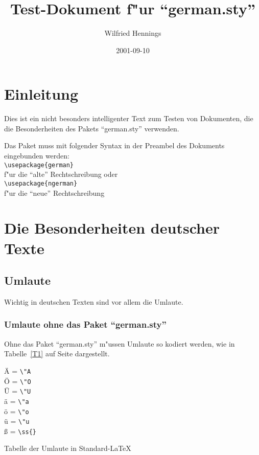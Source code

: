 \documentclass[11pt]{article} %
\title{Test-Dokument f"ur "`german.sty"'}
\author{Wilfried Hennings}
\date{2001-09-10}
\begin{document}
\maketitle

\tableofcontents

\section{Einleitung}
Dies ist ein nicht besonders intelligenter Text zum Testen von
Dokumenten, die die Besonderheiten des Pakets "`german.sty"' verwenden.

Das Paket muss mit folgender Syntax in der Preambel des Dokuments
eingebunden werden:\\
\verb|\usepackage{german}|\\
f"ur die "`alte"' Rechtschreibung oder \\
\verb|\usepackage{ngerman}|\\
f"ur die "`neue"' Rechtschreibung 


\section{Die Besonderheiten deutscher Texte}
\subsection{Umlaute}

Wichtig in deutschen Texten sind vor allem die Umlaute.

\subsubsection{Umlaute ohne das Paket "`german.sty"'}
Ohne das Paket "`german.sty"' m"ussen Umlaute so kodiert werden, wie in
Tabelle~\ref{T1} auf Seite \pageref{T1} dargestellt.
\begin{table}[ht]
\"A = \verb|\"A|\\
\"O = \verb|\"O|\\
\"U = \verb|\"U|\\
\"a = \verb|\"a|\\
\"o = \verb|\"o|\\
\"u = \verb|\"u|\\
\ss{} = \verb|\ss{}|
\caption{Tabelle der Umlaute in Standard-LaTeX} 
\label{T1}
\end{table}
\end{document}
